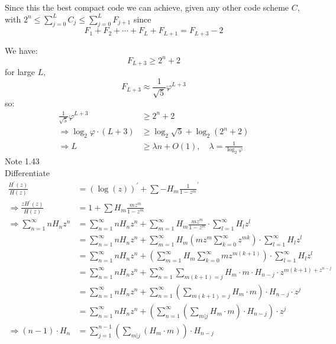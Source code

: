 \documentclass{article}
\newcommand{\myderiv}[1]{#1^\prime}
\newcommand{\mySum}[3]{\ensuremath{\sum_{#1 = #2}^{#3}}}
\begin{document}
Since this the best compact code we can achieve, given any other code scheme $C$, with $2^n \leq \mySum{j}{0}{L} C_j \leq \mySum{j}{0}{L} F_{j+1}$
since 
\[F_1 + F_2 + \cdots + F_{L} + F_{L+1} = F_{L+3} - 2\]

We have:
\[F_{L+3} \geq 2^n + 2\]
for large $L$, \[F_{L+3} \approx \frac{1}{\sqrt{5}}\varphi^{L+3}\]
so:
\begin{align*}
	\frac{1}{\sqrt{5}}\varphi^{L+3} &\geq 2^n + 2 \\
	\Rightarrow \log_2 \varphi \cdot (L + 3) &\geq \log_2 {\sqrt{5}} + \log_2 (2^n + 2) \\
	\Rightarrow L &\geq \lambda n + O(1), \quad \lambda = \frac{1}{\log_2 \varphi}
\end{align*}
Note 1.43\\
Differentiate 
\begin{align*}
	\frac{H^{'}(z)}{H(z)} &= \myderiv{(\log (z))} + \sum \myderiv{-H_m \frac{1}{1-z^m}}\\
	\Rightarrow \frac{zH^\prime(z)}{H(z)} &= 1 + \sum H_m \frac{mz^m}{1 - z^m}\\
	\Rightarrow \sum_{n = 1}^{\infty} nH_n z^n &= \mySum{n}{1}{\infty}  nH_n z^n + \mySum{m}{1}{\infty} H_m \frac{mz^m}{1- z^m} \cdot \sum_{l = 1}^{\infty} H_l z^l \\
	&= \mySum{n}{1}{\infty}  nH_n z^n + \mySum{m}{1}{\infty} H_m (mz^m \mySum{k}{0}{\infty}z^{mk}) \cdot \sum_{l = 1}^{\infty} H_l z^l \\
	&= \mySum{n}{1}{\infty}  nH_n z^n + (\mySum{m}{1}{\infty} H_m \mySum{k}{0}{\infty}mz^{m(k+1)}) \cdot \sum_{l = 1}^{\infty} H_l z^l\\
	&= \mySum{n}{1}{\infty}  nH_n z^n + \mySum{n}{1}{\infty}\sum_{m(k+1) = j} H_m \cdot m \cdot H_{n-j} \cdot z^{m(k+1) + z^{n-j}} \\
	&= \mySum{n}{1}{\infty}  nH_n z^n + \mySum{n}{1}{\infty} (\sum_{m(k+1) = j} H_m \cdot m) \cdot H_{n-j} \cdot z^{j}\\
	&= \mySum{n}{1}{\infty}  nH_n z^n +( \mySum{n}{1}{\infty} (\sum_{m | j} H_m \cdot m) \cdot H_{n-j} ) \cdot z^{j} \\
	\Rightarrow (n-1)\cdot H_n &= \mySum{j}{1}{n-1} (\sum_{m | j} (H_m \cdot m)) \cdot H_{n-j}
\end{align*}
\end{document}
